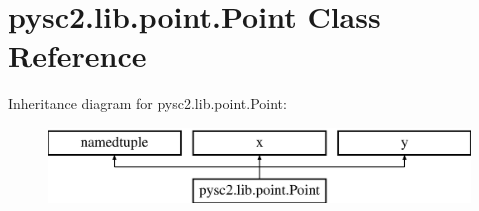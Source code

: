 \hypertarget{classpysc2_1_1lib_1_1point_1_1_point}{}\section{pysc2.\+lib.\+point.\+Point Class Reference}
\label{classpysc2_1_1lib_1_1point_1_1_point}
Inheritance diagram for pysc2.\+lib.\+point.\+Point\+:\begin{figure}[H]
\begin{center}
\leavevmode
\includegraphics[height=2.000000cm]{classpysc2_1_1lib_1_1point_1_1_point}
\end{center}
\end{figure}
